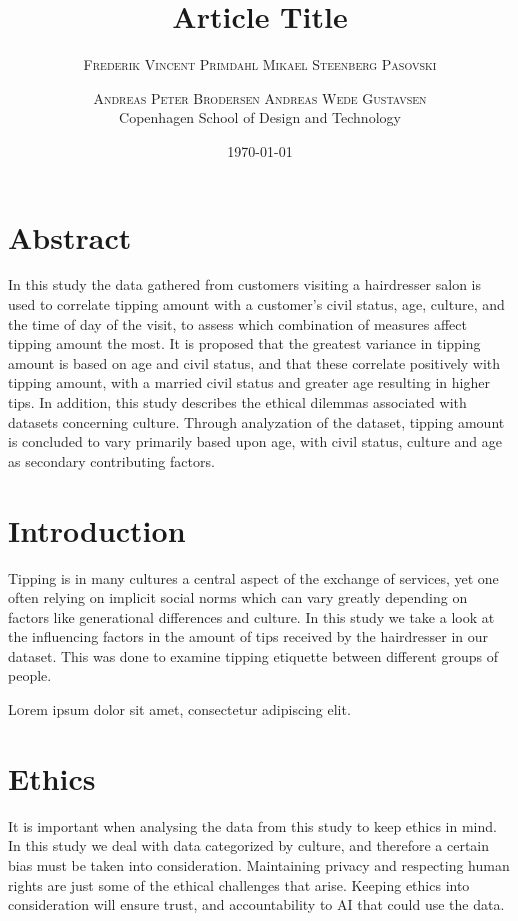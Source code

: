 \documentclass[twoside,twocolumn]{article}
\title{Article Title} %
\author{%
\textsc{Frederik Vincent Primdahl} \textsc{Mikael Steenberg Pasovski} \and \textsc{Andreas Peter Brodersen} \textsc{Andreas Wede Gustavsen}\\
\normalsize Copenhagen School of Design and Technology\\ %
}
\date{\today} %
\begin{document}
\maketitle


\section{Abstract}
In this study the data gathered from customers visiting a hairdresser salon is used to correlate tipping amount with a customer's civil status, age, culture, and the time of day of the visit, to assess which combination of measures affect tipping amount the most. It is proposed that the greatest variance in tipping amount is based on age and civil status, and that these correlate positively with tipping amount, with a married civil status and greater age resulting in higher tips. In addition, this study describes the ethical dilemmas associated with datasets concerning culture. Through analyzation of the dataset, tipping amount is concluded to vary primarily based upon age, with civil status, culture and age as secondary contributing factors.

\section{Introduction}
Tipping is in many cultures a central aspect of the exchange of services, yet one often relying on implicit social norms which can vary greatly depending on factors like generational differences and culture. In this study we take a look at the influencing factors in the amount of tips received by the hairdresser in our dataset. This was done to examine tipping etiquette between different groups of people.

\lettrine[nindent=0em,lines=3]{L} orem ipsum dolor sit amet, consectetur adipiscing elit.

\section{Ethics} It is important when analysing the data from this study to keep ethics in mind. In this study we deal with data categorized by culture, and therefore a certain bias must be taken into consideration. Maintaining privacy and respecting human rights are just some of the ethical challenges that arise. Keeping ethics into consideration will ensure trust, and accountability to AI that could use the data.
\end{document}
